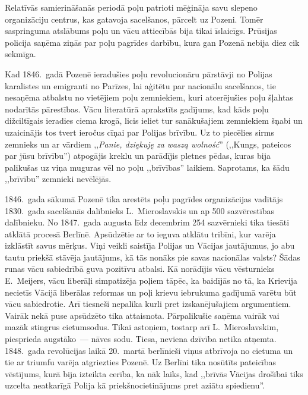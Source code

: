 \documentclass[twoside,a5paper,12pt,fleqn,openany]{extbook}
\newcommand{\pltxti}[1]{\textit{\textpolish{#1}}}
\begin{document}
Relatīvās samierināšanās periodā poļu patrioti mēģināja savu slepeno organizāciju centrus, kas gatavoja sacelšanos, pārcelt uz Pozeni. Tomēr saspringuma atslābums poļu un vācu attiecībās bija tikai īslaicīgs. Prūsijas policija saņēma ziņās par poļu pagrīdes darbību, kura gan Pozenā nebija diez cik sekmīga.

Kad 1846.~gadā Pozenē ieradušies poļu revolucionāru pārstāvji no Polijas karalistes un emigranti no Parīzes, lai aģitētu par nacionālu sacelšanos, tie nesaņēma atbalstu no vietējiem poļu zemniekiem, kuri atcerējušies poļu šļahtas nodarītās pārestības. Vācu literatūrā aprakstīts gadījums, kad kāds poļu dižciltīgais ieradies ciema krogā, licis ieliet tur sanākušajiem zemniekiem šņabi un uzaicinājis tos tvert ieročus cīņai par Polijas brīvību. Uz to piecēlies sirms zemnieks un ar vārdiem ,,\pltxti{Panie, dziękuję za waszą wolność}'' (,,Kungs, pateicos par jūsu brīvību'') atpogājis kreklu un parādījis pletnes pēdas, kuras bija palikušas uz viņa muguras vēl no poļu ,,brīvības'' laikiem. Saprotams, ka šādu ,,brīvību'' zemnieki nevēlējās.

1846.~gada sākumā Pozenē tika arestēts poļu pagrīdes organizācijas vadītājs 1830.~gada sacelšanās dalībnieks L.~Mieroslavskis un ap 500 sazvērestības dalībnieku. No 1847.~gada augusta līdz decembrim 254 sazvērnieki tika tiesāti atklātā procesā Berlīnē. Apsūdzētie ar to ieguva atklātu tribīni, kur varēja izklāstīt savus mērķus. Viņi veikli saistīja Polijas un Vācijas jautājumus, jo abu tautu priekšā stāvēja jautājums, kā tās nonāks pie savas nacionālas valsts? Šādas runas vācu sabiedrībā guva pozitīvu atbalsi. Kā norādījis vācu vēsturnieks E.~Meijers, vācu liberāļi simpatizēja poļiem tāpēc, ka baidījās no tā, ka Krievija necietīs Vācijā liberālas reformas un poļi krievu iebrukuma gadījumā varētu būt vācu sabiedrotie. Arī tiesneši nepalika kurli pret izskanējušajiem argumentiem. Vairāk nekā puse apsūdzēto tika attaisnota. Pārpalikušie saņēma vairāk vai mazāk stingrus cietumsodus. Tikai astoņiem, tostarp arī L.~Mieroslavskim, piesprieda augstāko~--- nāves sodu. Tiesa, neviena dzīvība netika atņemta. 1848.~gada revolūcijas laikā 20.~martā berlīnieši viņus atbrīvoja no cietuma un tie ar triumfu varēja atgriezties Pozenē. Uz Berlīni tika nosūtīts pateicības vēstījums, kurā bija izteikta cerība, ka nāk laiks, kad ,,brīvās Vācijas drošībai tiks uzcelta neatkarīgā Polija kā priekšnocietinājums pret aziātu spiedienu''.
\end{document}
